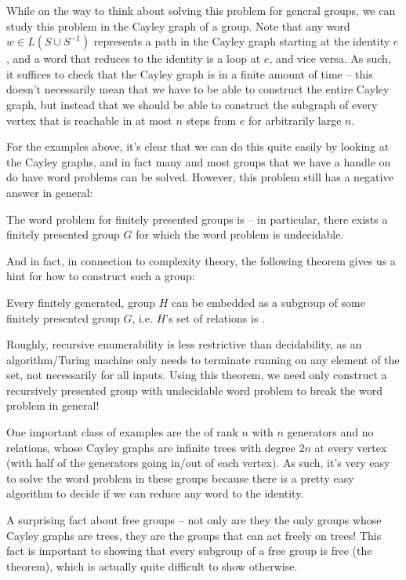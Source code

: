 \documentclass[12pt]{article}
\begin{document}
While on the way to think about solving this problem for general groups, we can
study this problem in the Cayley graph of a group. Note that any word $w \in L(S
\cup S^{-1})$ represents a path in the Cayley graph starting at the identity
$e$, and a word that reduces to the identity is a loop at $e$, and vice versa.
As such, it suffices to check that the Cayley graph is  in a
finite amount of time -- this doesn't necessarily mean that we have to be able
to construct the entire Cayley graph, but instead that we should be able to
construct the subgraph of every vertex that is reachable in
at most $n$ steps from $e$ for arbitrarily large $n$. 

For the examples above, it's clear that we can do this quite easily by looking
at the Cayley graphs, and in fact many and most groups that we have a handle on
do have word problems can be solved. However, this problem still has a negative
answer in general: 
\begin{theorem}
  The word problem for finitely presented groups is  -- in
  particular, there exists a finitely presented group $G$ for which the word
  problem is undecidable. 
\end{theorem}
And in fact, in connection to complexity theory, the following theorem
gives us a hint for how to construct such a group: 
\begin{theorem}
  Every finitely generated,  group $H$ can be embedded as a
 subgroup of some finitely presented group $G$, i.e. $H$'s
 set of relations is . 
\end{theorem}
Roughly, recursive enumerability is less restrictive than decidability, as an 
algorithm/Turing machine only needs to terminate running on any element of the
set, not necessarily for all inputs. Using this theorem, we need only construct
a recursively presented group with undecidable word problem to break the word
problem in general!

\begin{remark}
One important class of examples are the  of rank $n$
  with $n$ generators and no relations, whose Cayley graphs are infinite trees
  with degree $2n$ at every vertex (with half of the generators going in/out of
  each vertex). As such, it's very easy to solve the word problem in these
  groups because there is a pretty easy algorithm to decide if we can reduce any
  word to the identity. 

  A surprising fact about free groups -- not only are they the only groups whose Cayley graphs
  are trees, they are the  groups that can act freely on trees! 
  This fact is important to showing that every subgroup of a free group is
  free (the  theorem), which is actually quite difficult
  to show otherwise.
\end{remark}
\end{document}
